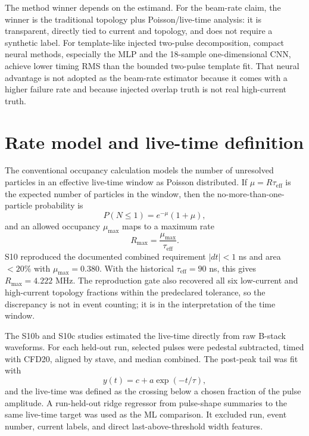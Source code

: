 The method winner depends on the estimand.  For the beam-rate claim, the
winner is the traditional topology plus Poisson/live-time analysis: it is
transparent, directly tied to current and topology, and does not require a
synthetic label.  For template-like injected two-pulse decomposition, compact
neural methods, especially the MLP and the 18-sample one-dimensional CNN,
achieve lower timing RMS than the bounded two-pulse template fit.  That neural
advantage is not adopted as the beam-rate estimator because it comes with a
higher failure rate and because injected overlap truth is not real
high-current truth.

\section{Rate model and live-time definition}
\label{sec:pileup_rate_model}

The conventional occupancy calculation models the number of unresolved
particles in an effective live-time window as Poisson distributed.  If
$\mu=R\tau_{\mathrm{eff}}$ is the expected number of particles in the window,
then the no-more-than-one-particle probability is
\begin{equation}
  P(N \leq 1) = e^{-\mu}(1+\mu),
  \label{eq:pileup_poisson}
\end{equation}
and an allowed occupancy $\mu_{\max}$ maps to a maximum rate
\begin{equation}
  R_{\max} = \frac{\mu_{\max}}{\tau_{\mathrm{eff}}}.
  \label{eq:pileup_rmax}
\end{equation}
S10 reproduced the documented combined requirement $|dt|<1$ ns and
area $<20\%$ with $\mu_{\max}=0.380$.  With the historical
$\tau_{\mathrm{eff}}=90$ ns, this gives
$R_{\max}=4.222$ MHz.  The reproduction gate also recovered all six
low-current and high-current topology fractions within the predeclared
tolerance, so the discrepancy is not in event counting; it is in the
interpretation of the time window.

The S10b and S10c studies estimated the live-time directly from raw B-stack
waveforms.  For each held-out run, selected pulses were pedestal subtracted,
timed with CFD20, aligned by stave, and median combined.  The post-peak tail
was fit with
\begin{equation}
  y(t) = c + a \exp(-t/\tau),
  \label{eq:pileup_tail_fit}
\end{equation}
and the live-time was defined as the crossing below a chosen fraction of the
pulse amplitude.  A run-held-out ridge regressor from pulse-shape summaries to
the same live-time target was used as the ML comparison.  It excluded run,
event number, current labels, and direct last-above-threshold width features.

